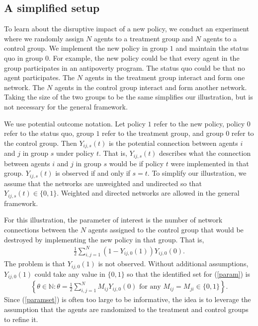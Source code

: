 \documentclass[12pt]{article}
\theoremstyle{definition}
\begin{document}
\subsection{A simplified setup}
To learn about the disruptive impact of a new policy, we conduct an experiment where we randomly assign $N$ agents to a treatment group and $N$ agents to a control group. We implement the new policy in group $1$ and maintain the status quo in group $0$. For example, the new policy could be that every agent in the group participates in an antipoverty program. The status quo could be that no agent participates. The $N$ agents in the treatment group interact and form one network. The $N$ agents in the control group interact and form another network. Taking the size of the two groups to be the same simplifies our illustration, but is not necessary for the general framework.   

We use potential outcome notation. Let policy $1$ refer to the new policy, policy $0$ refer to the status quo, group $1$ refer to the treatment group, and group $0$ refer to the control group. Then $Y_{ij,s}(t)$ is the potential connection between agents $i$ and $j$ in group $s$ under policy $t$. That is, $Y_{ij,s}(t)$ describes what the connection between agents $i$ and $j$ in group $s$ would be if policy $t$ were implemented in that group. $Y_{ij,s}(t)$ is observed if and only if $s = t$. To simplify our illustration, we assume that the networks are unweighted and undirected so that $Y_{ij,s}(t) \in \{0,1\}$. Weighted and directed networks are allowed in the general framework.     

For this illustration, the parameter of interest is the number of network connections between the $N$ agents assigned to the control group that would be destroyed by implementing the new policy in that group. That is, 
\begin{align}\label{param}
\frac{1}{2}\sum_{i,j = 1}^{N}(1-Y_{ij,0}(1))Y_{ij,0}(0). 
\end{align}
The problem is that $Y_{ij,0}(1)$ is not observed. Without additional assumptions, $Y_{ij,0}(1)$ could take any value in $\{0,1\}$ so that the identified set for (\ref{param}) is 
\begin{align}\label{paramset}
\left\{\theta \in \mathbb{N} : \theta = \frac{1}{2}\sum_{i,j = 1}^{N}M_{ij}Y_{ij,0}(0) \text{ for any } M_{ij} = M_{ji} \in \{0,1\}\right\}.
\end{align}
Since (\ref{paramset}) is often too large to be informative, the idea is to leverage the assumption that the agents are randomized to the treatment and control groups to refine it.    
\end{document}

